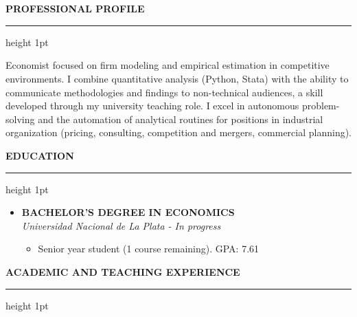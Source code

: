 \documentclass[11pt, a4paper]{article}
\begin{document}
\section*{}
{\Large \bfseries \faUser\hspace{0.4em} PROFESSIONAL PROFILE}
\vspace{0.4em}
\hrule height 1pt \color{linecolor}
\vspace{1em}

{\large \color{darktext}
Economist focused on firm modeling and empirical estimation in competitive environments. I combine quantitative analysis (Python, Stata) with the ability to communicate methodologies and findings to non-technical audiences, a skill developed through my university teaching role. I excel in autonomous problem-solving and the automation of analytical routines for positions in industrial organization (pricing, consulting, competition and mergers, commercial planning).
}

\vspace{1.8em}

{\Large \color{darktext} \bfseries \faGraduationCap\hspace{0.5em} EDUCATION}
\vspace{0.4em}
\hrule height 1pt \color{linecolor}
\vspace{0.2em}

\begin{itemize}[label=\small$\bullet$, leftmargin=1.4em, itemsep=0.8em]
\color{darktext}
    \item {\large \textbf{BACHELOR'S DEGREE IN ECONOMICS}}\\
    {\color{subtext}\textit{Universidad Nacional de La Plata - In progress}}
    \begin{itemize}[label=\tiny$\bullet$]
        \item {\large \color{subtext} Senior year student (1 course remaining). GPA: 7.61}
    \end{itemize}

\end{itemize}

\vspace{1.0em}


{\Large \color{darktext} \bfseries \faGraduationCap\hspace{0.5em} ACADEMIC AND TEACHING EXPERIENCE}
\vspace{0.4em}
\hrule height 1pt \color{linecolor}
\vspace{0.2em}
\end{document}
